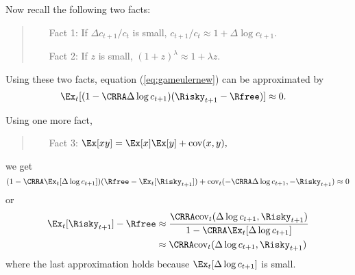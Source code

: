 \documentclass{handout}
\begin{document}
\noindent Now recall the following two facts:

\begin{quote}
  \begin{itemize}

  \item[Fact 1: ] If $\Delta c_{t+1}/c_{t}$ is small, $c_{t+1}/c_{t} \approx 1+ \Delta \log c_{t+1}.$

  \item[Fact 2: ] If $z$ is small, $(1+z)^{\lambda} \approx 1 + \lambda z$.

  \end{itemize}
\end{quote}

\noindent Using these two facts, equation (\ref{eq:gameulernew}) can be approximated by
\begin{equation}\begin{gathered}\begin{aligned}
      \Ex_{t}[(1-\CRRA \Delta \log {c}_{t+1})(\Risky_{t+1}-\Rfree)] & \approx  0.
    \end{aligned}\end{gathered}\end{equation}

\noindent Using one more fact,
\begin{quote}
  \begin{itemize}
  \item[Fact 3:] $\Ex [xy] = \Ex [x]\Ex [y] + \text{cov}(x,y),$
  \end{itemize}
\end{quote}
we get
\begin{equation}
  (1-\CRRA \Ex_{t}[\Delta \log {c}_{t+1}])(\Rfree - \Ex_{t}[\Risky_{t+1}])+\text{cov}_{t}(-\CRRA \Delta \log {c}_{t+1},-\Risky_{t+1})  \approx  0  
\end{equation}
or
\begin{equation}\begin{gathered}\begin{aligned}
      \Ex_{t}[\Risky_{t+1}]-\Rfree & \approx  \frac{\CRRA \text{cov}_{t}(\Delta \log {c}_{t+1},\Risky_{t+1})}{1-\CRRA \Ex_{t}[ \Delta \log {c}_{t+1}]} 
      \\                             & \approx  \CRRA \text{cov}_{t}(\Delta \log {c}_{t+1},\Risky_{t+1}) \label{eq:eqprem}
    \end{aligned}\end{gathered}\end{equation}
\noindent where the last approximation holds because $\Ex_{t}[\Delta 
\log {c}_{t+1}]$ is small.  
\end{document}
